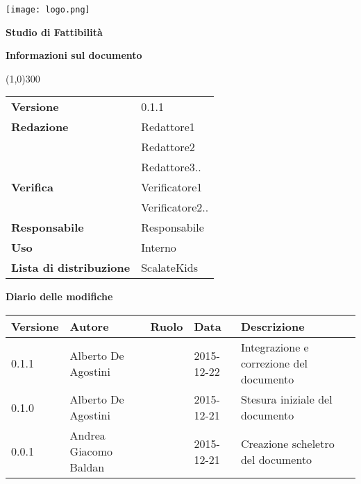 \documentclass{scalatekids-article}
\begin{document}
\begin{titlepage}
  \centering
  \texttt{[image: logo.png]}\par\vspace{1cm}
  \vspace{1.5cm}
         {\Huge\bfseries Studio di Fattibilità \par}
         \begin{center}
           \vspace{1.0cm}
                  {\large\bfseries Informazioni sul documento \par}
         \end{center}
         \vspace{-1cm}
         \begin{center}
           \line(1,0){300}
         \end{center}
         \vspace{0cm}
         \begin{tabular}[c]{l|l}
           \textbf{Versione} & 0.1.1\\
           \textbf{Redazione} & Redattore1\\ & Redattore2\\ & Redattore3..\\
           \textbf{Verifica} & Verificatore1\\ & Verificatore2..\\
           \textbf{Responsabile} & Responsabile\\
           \textbf{Uso} & Interno\\
           \textbf{Lista di distribuzione} & ScalateKids
         \end{tabular}
\end{titlepage}
\clearpage
\setcounter{page}{1}
\begin{flushleft}
  \vspace{0cm}
         {\large\bfseries Diario delle modifiche \par}
\end{flushleft}
\vspace{0cm}
\begin{center}
  \begin{tabular}{| l | l | l | l | l |}
    \hline
    Versione & Autore & Ruolo & Data & Descrizione \\
    \hline
    0.1.1 & Alberto De Agostini & & 2015-12-22 & Integrazione e correzione del documento\\
    \hline
    0.1.0 & Alberto De Agostini & & 2015-12-21 & Stesura iniziale del documento\\
    \hline
    0.0.1 & Andrea Giacomo Baldan & & 2015-12-21 & Creazione scheletro del documento\\
    \hline
  \end{tabular}
\end{center}
\tableofcontents
\end{document}
